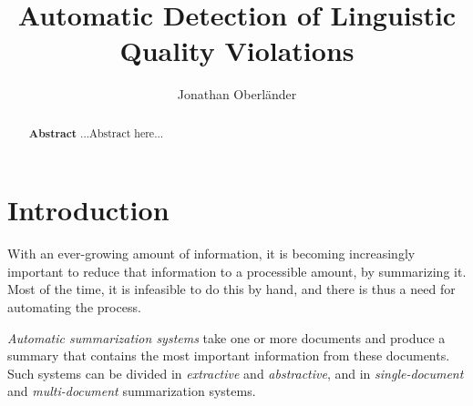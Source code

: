 \documentclass[a4paper,10pt]{scrartcl}
\author{Jonathan Oberländer}
\title{Automatic Detection of Linguistic Quality Violations}
\theoremstyle{style}
\begin{document}


\thispagestyle{empty}
\begin{abstract}
\setlength{\parskip}{2ex plus 0.5ex minus 0.2ex}
\textbf{Abstract} \quad ...Abstract here...

\end{abstract}
\newpage

\thispagestyle{empty}
\tableofcontents
\newpage

\setcounter{page}{1}		%
\newpage







\maketableofcontents

\section{Introduction}

With an ever-growing amount of information, it is becoming increasingly important to reduce that information to a processible amount, by summarizing it. Most of the time, it is infeasible to do this by hand, and there is thus a need for automating the process.

\textit{Automatic summarization systems} take one or more documents and produce a summary that contains the most important information from these documents. Such systems can be divided in \textit{extractive} and \textit{abstractive}, and in \textit{single-document} and \textit{multi-document} summarization systems.
\end{document}
